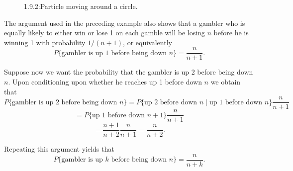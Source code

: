 \documentclass[lang=cn,10pt,thmcnt=section]{elegantbook}
\begin{document}
\begin{solution}
\begin{figure}[htbp]
	\caption{1.9.2:Particle moving around a circle.}
	\label{fig:1.9.2}
	\end{figure}
\end{solution}
\begin{remark}
The argument used in the preceding example also shows that a gambler who is equally likely to either win or lose 1 on each gamble will be losing $n$ before he is winning 1 with probability $1/(n + 1)$, or equivalently
\[
P\{\text{gambler is up 1 before being down } n\} = \frac{n}{n + 1}.
\]

Suppose now we want the probability that the gambler is up 2 before being down $n$. Upon conditioning upon whether he reaches up 1 before down $n$ we obtain that
\[
P\{\text{gambler is up 2 before being down } n\} = P\{\text{up 2 before down } n \mid \text{up 1 before down } n\} \frac{n}{n + 1}
\]
\[
= P\{\text{up 1 before down } n + 1\} \frac{n}{n + 1}
\]
\[
= \frac{n + 1}{n + 2} \frac{n}{n + 1} = \frac{n}{n + 2}.
\]

Repeating this argument yields that
\[
P\{\text{gambler is up } k \text{ before being down } n\} = \frac{n}{n + k}.
\]
\end{remark}
\end{document}
